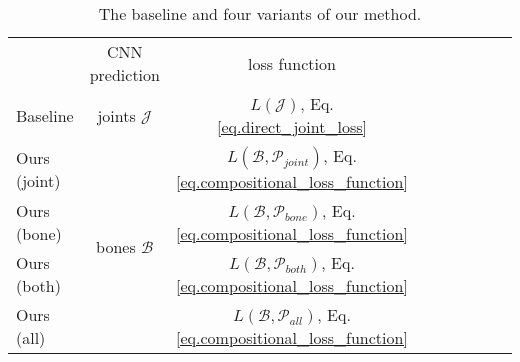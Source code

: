 \documentclass[10pt,twocolumn,letterpaper]{article}
\begin{document}

\begin{table}
\begin{center}
\begin{tabular}{lcccccccc}
\hline\noalign{\smallskip}
 & CNN prediction  & loss function\\
\noalign{\smallskip}
\hline
\noalign{\smallskip}
Baseline 		& joints $\mathcal{J}$ 		& $L(\mathcal{J})$, Eq.\eqref{eq.direct_joint_loss}	\\
\hline
Ours (joint) 	& \multirow{4}{*}{bones $\mathcal{B}$}  & $L(\mathcal{B},\mathcal{P}_{joint})$, Eq.\eqref{eq.compositional_loss_function}	\\
Ours (bone) 		&									    & 
$L(\mathcal{B},\mathcal{P}_{bone})$, Eq.\eqref{eq.compositional_loss_function}	\\
Ours (both) 		&								    	& 
$L(\mathcal{B},\mathcal{P}_{both})$, Eq.\eqref{eq.compositional_loss_function}	\\
Ours (all) 		&									    & 
$L(\mathcal{B},\mathcal{P}_{all})$, Eq.\eqref{eq.compositional_loss_function}	\\
\hline
\end{tabular}
\caption{The baseline and four variants of our method.}
\label{table:baselines}
\end{center}
\end{table}
\end{document}
